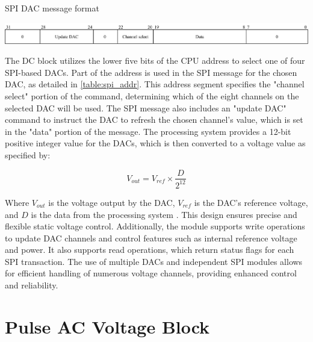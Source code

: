 \begin{table}[ht]
\centering
\setlength{\abovecaptionskip}{5pt}    %
\setlength{\belowcaptionskip}{5pt}    %
\caption{SPI DAC message format}

\includegraphics[width=1.0\textwidth]{figures/spi_addr.png}
\label{table:spi_addr}
\end{table}

The DC block utilizes the lower five bits of the CPU address to select one of four SPI-based DACs. Part of the address is used in the SPI message for the chosen DAC, as detailed in \autoref{table:spi_addr}. This address segment specifies the "channel select" portion of the command, determining which of the eight channels on the selected DAC will be used. The SPI message also includes an "update DAC" command to instruct the DAC to refresh the chosen channel's value, which is set in the "data" portion of the message. The processing system provides a 12-bit positive integer value for the DACs, which is then converted to a voltage value as specified by:

\begin{equation}
V_{out} = V_{ref} \times \frac{D}{2^{12}}
\end{equation}

Where $V_{out}$ is the voltage output by the DAC, $V_{ref}$ is the DAC's reference voltage, and $D$ is the data from the processing system \cite{ad5628}. This design ensures precise and flexible static voltage control. Additionally, the module supports write operations to update DAC channels and control features such as internal reference voltage and power. It also supports read operations, which return status flags for each SPI transaction. The use of multiple DACs and independent SPI modules allows for efficient handling of numerous voltage channels, providing enhanced control and reliability.

\section{Pulse AC Voltage Block}

